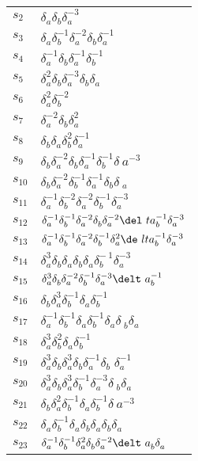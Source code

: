 \documentclass{article}
\begin{document}
\begin{center}
\begin{tabular}{ll}
$s_{2}$ & $\delta_a^{}\delta_b^{}\delta_a^{-3}$ \\
$s_{3}$ & $\delta_a^{}\delta_b^{-1}\delta_a^{-2}\delta_b^{}\delta_a^{-1}$ \\
$s_{4}$ & $\delta_a^{-1}\delta_b^{}\delta_a^{-1}\delta_b^{-1}$ \\
$s_{5}$ & $\delta_a^{2}\delta_b^{}\delta_a^{-3}\delta_b^{}\delta_a^{}$ \\
$s_{6}$ & $\delta_a^{2}\delta_b^{-2}$ \\
$s_{7}$ & $\delta_a^{-2}\delta_b^{}\delta_a^{2}$ \\
$s_{8}$ & $\delta_b^{}\delta_a^{}\delta_b^{2}\delta_a^{-1}$ \\
$s_{9}$ & $\delta_b^{}\delta_a^{-2}\delta_b^{}\delta_a^{-1}\delta_b^{-1}\delta_\
a^{-3}$ \\
$s_{10}$ & $\delta_b^{}\delta_a^{-2}\delta_b^{-1}\delta_a^{-1}\delta_b^{}\delta\
_a^{}$ \\
$s_{11}$ & $\delta_a^{-1}\delta_b^{-2}\delta_a^{-2}\delta_b^{-1}\delta_a^{-3}$ 
\\
$s_{12}$ & $\delta_a^{-1}\delta_b^{-1}\delta_a^{-2}\delta_b^{}\delta_a^{-2}\del\
ta_b^{-1}\delta_a^{-3}$ \\
$s_{13}$ & $\delta_a^{-1}\delta_b^{-1}\delta_a^{-2}\delta_b^{-1}\delta_a^{2}\de\
lta_b^{-1}\delta_a^{-3}$ \\
$s_{14}$ & $\delta_a^{3}\delta_b^{}\delta_a^{}\delta_b^{}\delta_a^{}\delta_b^{-\
1}\delta_a^{-3}$ \\
$s_{15}$ & $\delta_a^{3}\delta_b^{}\delta_a^{-2}\delta_b^{-1}\delta_a^{-3}\delt\
a_b^{-1}$ \\
$s_{16}$ & $\delta_b^{}\delta_a^{3}\delta_b^{-1}\delta_a^{}\delta_b^{-1}$ \\
$s_{17}$ & $\delta_a^{-1}\delta_b^{-1}\delta_a^{}\delta_b^{-1}\delta_a^{}\delta\
_b^{}\delta_a^{}$ \\
$s_{18}$ & $\delta_a^{3}\delta_b^{2}\delta_a^{}\delta_b^{-1}$ \\
$s_{19}$ & $\delta_a^{3}\delta_b^{}\delta_a^{3}\delta_b^{}\delta_a^{-1}\delta_b\
^{}\delta_a^{-1}$ \\
$s_{20}$ & $\delta_a^{3}\delta_b^{}\delta_a^{3}\delta_b^{-1}\delta_a^{-3}\delta\
_b^{}\delta_a^{}$ \\
$s_{21}$ & $\delta_b^{}\delta_a^{2}\delta_b^{-1}\delta_a^{}\delta_b^{-1}\delta_\
a^{-3}$ \\
$s_{22}$ & $\delta_a^{}\delta_b^{-1}\delta_a^{}\delta_b^{}\delta_a^{}\delta_b^{\
}\delta_a^{}$ \\
$s_{23}$ & $\delta_a^{-1}\delta_b^{-1}\delta_a^{2}\delta_b^{}\delta_a^{-2}\delt\
a_b^{}\delta_a^{}$ \\
\bottomrule
\end{tabular}
\end{center}

\thispagestyle{empty}
\end{document}
